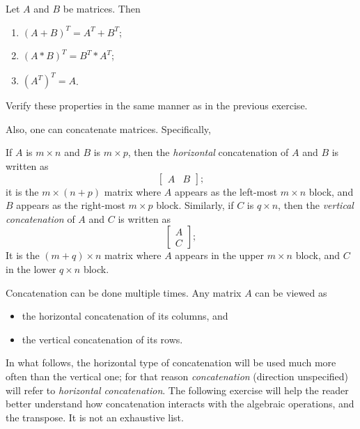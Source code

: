 \documentclass{ximera}
\begin{document}
\begin{theorem} Let $A$ and $B$ be matrices. Then
\begin{enumerate}
\item $(A+B)^T = A^T + B^T$;
\item $(A*B)^T = B^T*A^T$;
\item $\left(A^T\right)^T = A$.
\end{enumerate}
\end{theorem}

\begin{exercise} Verify these properties in the same manner as in the previous exercise.
\end{exercise}

Also, one can concatenate matrices. Specifically,

\begin{definition} If $A$ is $m\times n$ and $B$ is $m\times p$, then the {\it horizontal} concatenation of $A$ and $B$ is written as
\[
\begin{bmatrix} 
A & B
\end{bmatrix};
\] 
it is the $m\times (n+p)$ matrix where $A$ appears as the left-most $m\times n$ block, and $B$ appears as the right-most $m\times p$ block. Similarly, if $C$ is $q\times n$, then the {\it vertical concatenation} of $A$ and $C$ is written as
\[
\begin{bmatrix} 
A\\ C
\end{bmatrix};
\]
It is the $(m+q)\times n$ matrix where $A$ appears in the upper $m\times n$ block, and $C$ in the lower $q\times n$ block.
\end{definition}
Concatenation can be done multiple times. Any matrix $A$ can be viewed as 
\begin{itemize}
\item the horizontal concatenation of its columns, and
\item the vertical concatenation of its rows.
\end{itemize}

In what follows, the horizontal type of concatenation will be used much more often than the vertical one; for that reason {\it concatenation} (direction unspecified) will refer to {\it horizontal concatenation}. The following exercise will help the reader better understand how concatenation interacts with the algebraic operations, and the transpose. It is not an exhaustive list.
\end{document}
